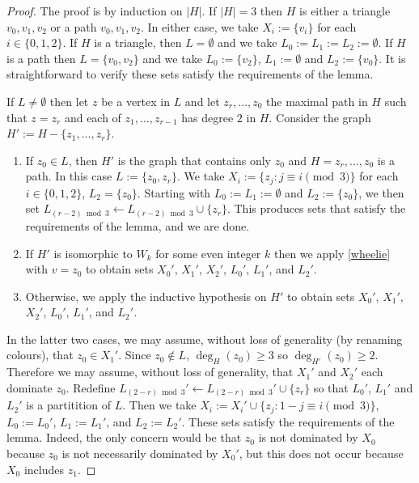 \documentclass[12pt]{article}
\theoremstyle{definition}
\begin{document}
\begin{proof}
  The proof is by induction on $|H|$.  If $|H|=3$ then $H$ is either a triangle $v_0,v_1,v_2$ or a path $v_0,v_1,v_2$.  In either case, we take $X_i:=\{v_i\}$ for each $i\in\{0,1,2\}$.  If $H$ is a triangle, then $L=\emptyset$ and we take $L_0:=L_1:=L_2:=\emptyset$.  If $H$ is a path then $L=\{v_0,v_2\}$ and we take $L_0:=\{v_2\}$, $L_1:=\emptyset$ and $L_2:=\{v_0\}$.  It is straightforward to verify these sets satisfy the requirements of the lemma.

  If $L\neq\emptyset$ then let $z$ be a vertex in $L$ and let $z_r,\ldots,z_0$ the maximal path in $H$ such that $z=z_r$ and each of $z_1,\ldots,z_{r-1}$ has degree $2$ in $H$. Consider the graph $H':=H-\{z_1,\ldots,z_{r}\}$.
  \begin{enumerate}
    \item If $z_0\in L$, then $H'$ is the graph that contains only $z_0$ and $H=z_r,\ldots,z_0$ is a path.  In this case $L:=\{z_0,z_r\}$. We take $X_i:=\{z_j:j\equiv i\pmod 3\}$ for each $i\in\{0,1,2\}$, $L_2=\{z_0\}$.  Starting with $L_0:=L_1:=\emptyset$ and $L_2:=\{z_0\}$, we then set
    $L_{(r-2)\bmod 3}\gets L_{(r-2)\bmod 3} \cup \{z_r\}$.  This produces sets that satisfy the requirements of the lemma, and we are done.

    \item If $H'$ is isomorphic to $W_k$ for some even integer $k$ then we apply \cref{wheelie} with $v=z_0$ to obtain sets $X_0'$, $X_1'$, $X_2'$, $L_0'$, $L_1'$, and $L_2'$.

    \item Otherwise, we apply the inductive hypothesis on $H'$ to obtain sets $X_0'$, $X_1'$, $X_2'$, $L_0'$, $L_1'$, and $L_2'$.
  \end{enumerate}
  In the latter two cases, we may assume, without loss of generality (by renaming colours), that $z_0\in X_{1}'$.  Since $z_0\not\in L$, $\deg_H(z_0)\ge 3$ so $\deg_{H'}(z_0)\ge 2$.  Therefore we may assume, without loss of generality, that $X_1'$ and $X_2'$ each dominate $z_0$. Redefine $L_{(2-r)\bmod 3}'\gets L_{(2-r)\bmod 3}'\cup\{z_r\}$ so that $L_0'$, $L_1'$ and $L_2'$ is a partitition of $L$.  Then we take $X_i:=X_{i}'\cup\{z_j:1-j\equiv i\pmod 3\}$, $L_0:=L_0'$, $L_1:= L_1'$, and $L_2:=L_2'$.  These sets satisfy the requirements of the lemma.  Indeed, the only concern would be that $z_0$ is not dominated by $X_0$ because $z_0$ is not necessarily dominated by $X_0'$, but this does not occur because $X_0$ includes $z_1$.


\end{proof}
\end{document}
